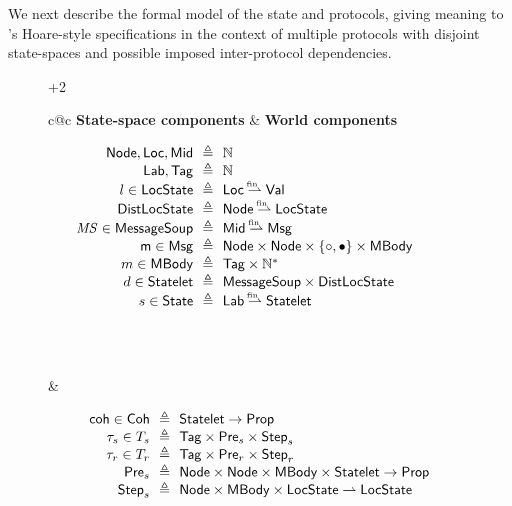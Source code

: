 We next describe the formal model of the state and protocols, giving
meaning to \disel's Hoare-style specifications in the context of
multiple protocols with disjoint state-spaces and possible
imposed inter-protocol dependencies.

\begin{figure}[t]
{\begin{varwidth}{\dimexpr\textwidth+2\fboxrule\relax}
\begin{tabular}{c@{\!\!\!\!\!\!\!\!\!\!}c}
\small{\textbf{State-space components}}
&
\small{\textbf{World components}}
\\
\begin{minipage}{0.5\linewidth}
{\scriptsize{
\[
\!\!\!\!\!\!\!\!\!\!\!\!\!
\begin{array}{r@{\ \ }c@{\ \ }l}
\Node, \Loc, \Mid & \eqdef & \Nat \\
\Lab, \Tag & \eqdef & \Nat \\
l \in \LocalState & \eqdef & \Loc \pmap \Val \\
\DLState & \eqdef & \Node \pmap \LocalState \\
  \MS \in\MessageSoup & \eqdef & \Mid \pmap \Msg \\
  \msg \in \Msg & \eqdef & \Node \times \Node \times \set{\Active,
                              \Consumed} \times \Mbody \\
  m \in \Mbody & \eqdef & \Tag \times \Nat^* \\
  d \in \Statelet & \eqdef & \MessageSoup \times \DLState \\
  s\in \State & \eqdef & \Lab \pmap \Statelet \\
\\ \\ \\
\end{array}
\]
}}
\end{minipage}
&
\begin{minipage}{0.5\linewidth}
{\scriptsize{
\[
\begin{array}{r@{\ \ }c@{\ \ }l}
  \coh \in \mathsf{Coh} & \eqdef & \Statelet \fun \Prop \\
  \Trans_s \in \Transitions_s & \eqdef & \Tag \times \Pre_s \times \Step_s \\
  \Trans_r \in \Transitions_r & \eqdef & \Tag \times \Pre_r \times \Step_r \\
  \Pre_s & \eqdef & \Node \times \Node \times \Mbody \times \Statelet
   \fun \Prop \\
  \Step_s & \eqdef & \Node \times \Mbody \times \LocalState \pfun \LocalState \\

\end{array}\]}}
\end{minipage}
\end{tabular}
\end{varwidth}}
\end{figure}

